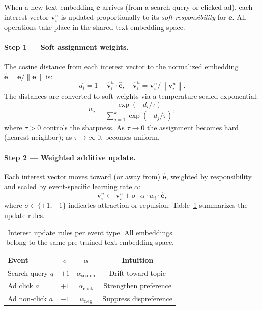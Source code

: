 \documentclass[10pt,twocolumn]{article}
\newcommand{\norm}[1]{\left\|#1\right\|}
\begin{document}
When a new text embedding $\bm{e}$ arrives (from a search query or
clicked ad), each interest vector $\bm{v}^u_i$ is updated proportionally
to its \emph{soft responsibility} for $\bm{e}$.
All operations take place in the shared text embedding space.

\paragraph{Step 1 --- Soft assignment weights.}
The cosine distance from each interest vector to the normalized embedding
$\hat{\bm{e}} = \bm{e}/\norm{\bm{e}}$ is:
\[
  d_i = 1 - \hat{\bm{v}}^u_i \cdot \hat{\bm{e}},
  \quad \hat{\bm{v}}^u_i = \bm{v}^u_i / \norm{\bm{v}^u_i}.
\]
The distances are converted to soft weights via a temperature-scaled
exponential:
\begin{equation}
  w_i = \frac{\exp(-d_i / \tau)}{\displaystyle\sum_{j=1}^{k} \exp(-d_j / \tau)},
  \label{eq:softweight}
\end{equation}
where $\tau > 0$ controls the sharpness.
As $\tau \to 0$ the assignment becomes hard (nearest neighbor);
as $\tau \to \infty$ it becomes uniform.

\paragraph{Step 2 --- Weighted additive update.}
Each interest vector moves toward (or away from) $\hat{\bm{e}}$,
weighted by responsibility and scaled by event-specific learning rate $\alpha$:
\begin{equation}
  \bm{v}^u_i \leftarrow
    \bm{v}^u_i + \sigma \cdot \alpha \cdot w_i \cdot \hat{\bm{e}},
  \label{eq:update}
\end{equation}
where $\sigma \in \{+1, -1\}$ indicates attraction or repulsion.
Table~\ref{tab:update_rules} summarizes the update rules.

\begin{table}[h]
\centering
\caption{Interest update rules per event type.
         All embeddings belong to the same pre-trained text embedding space.}
\label{tab:update_rules}
\small
\begin{tabular}{lccc}
\toprule
Event & $\sigma$ & $\alpha$ & Intuition \\
\midrule
Search query $q$ & $+1$ & $\alpha_{\text{search}}$ & Drift toward topic \\
Ad click $a$     & $+1$ & $\alpha_{\text{click}}$  & Strengthen preference \\
Ad non-click $a$ & $-1$ & $\alpha_{\text{neg}}$    & Suppress dispreference \\
\bottomrule
\end{tabular}
\end{table}
\end{document}
